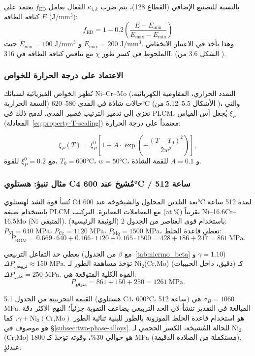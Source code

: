 \documentclass[12pt,a4paper]{article}
\begin{document}
	بالنسبة للتصنيع الإضافي (القطاع 128)، يتم ضرب \(\kappa_{i,k}\) الفعال بعامل \(f_{\text{ED}}\) يعتمد على كثافة الطاقة \(E\) (J/mm\(^3\)):
	\[
	f_{\text{ED}} = 1 - 0.2\left(\frac{E - E_{\text{min}}}{E_{\text{max}} - E_{\text{min}}}\right)
	\]
	حيث \(E_{\text{min}}=100\) J/mm\(^3\) و \(E_{\text{max}}=200\) J/mm\(^3\). وهذا يأخذ في الاعتبار الانخفاض الملحوظ في كسر طور \(\chi\) مع تناقص كثافة الطاقة في 316L (الشكل 3.6 من \cite{dis2025}).
	
	\subsubsection{الاعتماد على درجة الحرارة للخواص}
	تُظهر الخواص الفيزيائية لسبائك Ni–Cr–Mo (التمدد الحراري، المقاومية الكهربائية، السعة الحرارية) حالات شاذة في المدى 580–620°C (الأشكال 5.5–5.12 من \cite{dis2025})، والتي تعزى إلى تدمير الترتيب قصير المدى. لدمج ذلك في PLCM، يُجعل أس القياس \(\xi_P\) (المعادلة~\ref{eq:property-T-scaling}) معتمداً على درجة الحرارة:
	
	\[
	\xi_P(T) = \xi_P^0 \left[1 + A \cdot \exp\left(-\frac{(T-T_0)^2}{2w^2}\right)\right],
	\]
	مع \(\xi_P^0 = 0.2\) للقوة، \(T_0 = 600\)°C، \(w = 50\)°C، و \(A = 0.1\) للقمة الشاذة.
	
	\subsubsection{مثال تنبؤ: هستلوي C4 مُشيخ عند 600°C / 512 ساعة}
	تُتنبأ قوة الشد لهستلوي C4 بعد التلدين المحلول والشيخوخة عند 600°C لمدة 512 ساعة باستخدام صيغة PLCM مع المعاملات المعايرة. التركيب (at.\%) تقريباً Ni–16.6Cr–16.5Mo (Ni المتبقي). باستخدام قوى العناصر من الجدول 2 (الوثيقة الرئيسية): \(P_{\text{Ni}}=640\) MPa، \(P_{\text{Cr}}=1120\) MPa، \(P_{\text{Mo}}=1500\) MPa، تعطي قاعدة الخلط:
	\[
	P_{\text{ROM}} = 0.669\cdot640 + 0.166\cdot1120 + 0.165\cdot1500 = 428 + 186 + 247 = 861\ \text{MPa}.
	\]
	
	يعطي حد التفاعل التربيعي (مع \(\beta\) من الجدول~\ref{tab:nicrmo_beta} و \(\gamma=1.10\)) \(\Delta P_{\text{تربيعي}} \approx 150\) MPa. تؤخذ مساهمة الطور لـ Ni\(_2\)(Cr,Mo) (دقيق، داخل الحبيبات) كـ \(\Delta P_{\text{طور}} = 250\) MPa. القوة الكلية المتوقعة هي:
	\[
	P_{\text{متوقع}} = 861 + 150 + 250 = 1261\ \text{MPa}.
	\]
	
	القيمة التجريبية من الجدول 5.1 (هستلوي C4، 600°C، 512 ساعة) هي \(\sigma_B = 1060\) MPa. المبالغة في التقدير تنشأ لأن الحد التربيعي يضاعف التقوية جزئياً؛ النهج الأكثر دقة هو استخدام قاعدة الخلط الموزونة بالطور للبنية ثنائية الطور \(\gamma + \text{Ni}_2(\text{Cr,Mo})\)، كما هو موصوف في \S\ref{subsec:two-phase-alloys}. للحالة المُشيخة، الكسر الحجمي لـ Ni\(_2\)(Cr,Mo) هو حوالي 30\%، وقوته تؤخذ كـ 1800 MPa (مستكملة من الصلادة الدقيقة). عندئذٍ:
	
\end{document}
